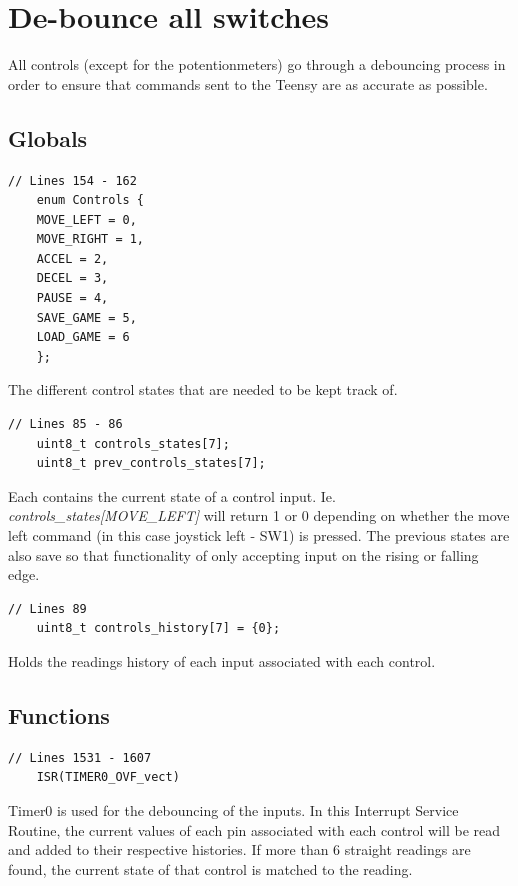 \documentclass{article}
\begin{document}
\clearpage

\section{De-bounce all switches}
All controls (except for the potentionmeters) go through a debouncing process in order to ensure that commands sent to the Teensy are as accurate as possible. 

\subsection*{Globals}
\begin{lstlisting}[style=CStyle]
	// Lines 154 - 162
	enum Controls {
    MOVE_LEFT = 0,
    MOVE_RIGHT = 1,
    ACCEL = 2,
    DECEL = 3,
    PAUSE = 4,
    SAVE_GAME = 5,
    LOAD_GAME = 6
	};
\end{lstlisting}
The different control states that are needed to be kept track of.
\begin{lstlisting}[style=CStyle]
	// Lines 85 - 86
	uint8_t controls_states[7];
	uint8_t prev_controls_states[7];
\end{lstlisting}
Each contains the current state of a control input. Ie. \emph{controls\_states[MOVE\_LEFT]} will return 1 or 0 depending on whether the move left command (in this case joystick left - SW1) is pressed. The previous states are also save so that functionality of only accepting input on the rising or falling edge. 
\begin{lstlisting}[style=CStyle]
	// Lines 89
	uint8_t controls_history[7] = {0};
\end{lstlisting}
Holds the readings history of each input associated with each control. 
\newline

\subsection*{Functions}
\begin{lstlisting}[style=CStyle]
	// Lines 1531 - 1607
	ISR(TIMER0_OVF_vect)
\end{lstlisting}
Timer0 is used for the debouncing of the inputs. In this Interrupt Service Routine, the current values of each pin associated with each control will be read and added to their respective histories. If more than 6 straight readings are found, the current state of that control is matched to the reading.
\end{document}
